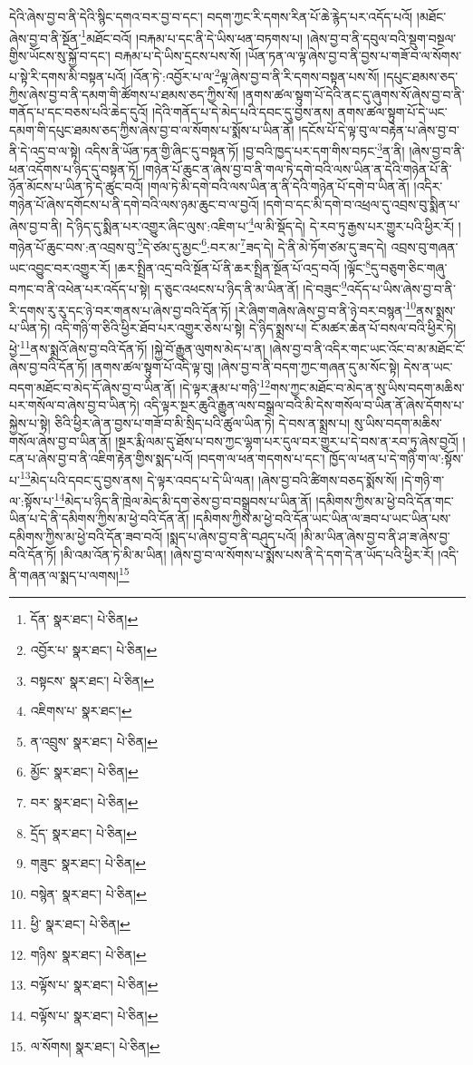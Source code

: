 དེའི་ཞེས་བྱ་བ་ནི་དེའི་སྙིང་དགའ་བར་བྱ་བ་དང་། བདག་ཀྱང་རི་དགས་རིན་པོ་ཆེ་རྙེད་པར་འདོད་པའོ། །མཐོང་ཞེས་བྱ་བ་ནི་སྔོན་\footnote{དོན་  སྣར་ཐང་།  པེ་ཅིན། }མཐོང་བའོ། །བརྐམ་པ་དང་ནི་དེ་ཡིས་ཕན་བཏགས་པ། །ཞེས་བྱ་བ་ནི་དབུལ་བའི་སྡུག་བསྔལ་གྱིས་ཡོངས་སུ་སྐྱོ་བ་དང་། བརྐམ་པ་དེ་ཡིས་དྲངས་པས་སོ། །ཡོན་ཏན་ལ་ལྟ་ཞེས་བྱ་བ་ནི་བྱས་པ་གཟོ་བ་ལ་སོགས་པ་སྟེ་རི་དགས་མི་བསྟན་པའོ། །འོན་ཏེ་:འབྱོར་པ་ལ་\footnote{འབྱོར་པ་  སྣར་ཐང་།  པེ་ཅིན། }ལྟ་ཞེས་བྱ་བ་ནི་རི་དགས་བསྟན་པས་སོ། །དཔུང་ཐམས་ཅད་ཀྱིས་ཞེས་བྱ་བ་ནི་དམག་གི་ཚོགས་པ་ཐམས་ཅད་ཀྱིས་སོ། །ནགས་ཚལ་སྟུག་པོ་དེའི་ནང་དུ་ཞུགས་སོ་ཞེས་བྱ་བ་ནི་གནོད་པ་དང་བཅས་པའི་ཆེད་དུའོ། །དེའི་གནོད་པ་དེ་མེད་པའི་དབང་དུ་བྱས་ནས། ནགས་ཚལ་སྟུག་པོ་དེ་ཡང་དམག་གི་དཔུང་ཐམས་ཅད་ཀྱིས་ཞེས་བྱ་བ་ལ་སོགས་པ་སྨོས་པ་ཡིན་ནོ། །དངོས་པོ་དེ་ལྟ་བུ་ལ་བརྟེན་པ་ཞེས་བྱ་བ་ནི་དེ་འདྲ་བ་ལ་སྟེ། འདིས་ནི་ཡོན་ཏན་གྱི་ཞིང་དུ་བསྟན་ཏོ། །བྱ་བའི་ཁྱད་པར་དག་གིས་བཏང་\footnote{བསྟངས་  སྣར་ཐང་།  པེ་ཅིན། }ན་ནི། །ཞེས་བྱ་བ་ནི་ཕན་འདོགས་པ་ཉིད་དུ་བསྟན་ཏོ། །གཉེན་པོ་ཆུང་ན་ཞེས་བྱ་བ་ནི་གལ་ཏེ་དགེ་བའི་ལས་ཡིན་ན་དེའི་གཉེན་པོ་ནི་ཉོན་མོངས་པ་ཡིན་ཏེ་དེ་ཚུང་བའོ། །གལ་ཏེ་མི་དགེ་བའི་ལས་ཡིན་ན་ནི་དེའི་གཉེན་པོ་དགེ་བ་ཡིན་ནོ། །འདིར་གཉེན་པོ་ཞེས་དགོངས་པ་ནི་དགེ་བའི་ལས་ཉམ་ཆུང་བ་ལ་བྱའོ། །དགེ་བ་དང་མི་དགེ་བ་འཕྲལ་དུ་འབྲས་བུ་སྨིན་པ་ཞེས་བྱ་བ་ནི། དེ་ཉིད་དུ་སྨིན་པར་འགྱུར་ཞིང་ལུས་:འཇིག་པ་\footnote{འཇིགས་པ་  སྣར་ཐང་། }ལ་མི་སྡོད་དེ། དེ་རབ་ཏུ་རྒྱས་པར་གྱུར་པའི་ཕྱིར་རོ། །གཉེན་པོ་ཆུང་བས་:ན་འབྲས་བུ་\footnote{ན་འབྲུས་  སྣར་ཐང་།  པེ་ཅིན། }དེ་ཙམ་དུ་མྱང་\footnote{མྱོང་  སྣར་ཐང་།  པེ་ཅིན། }:བར་མ་\footnote{བར་  སྣར་ཐང་།  པེ་ཅིན། }ཟད་དེ། དེ་ནི་མེ་ཏོག་ཙམ་དུ་ཟད་དེ། འབྲས་བུ་གཞན་ཡང་འབྱུང་བར་འགྱུར་རོ། །ཆར་སྤྲིན་འདྲ་བའི་སྔོན་པོ་ནི་ཆར་སྤྲིན་སྔོན་པོ་འདྲ་བའོ། །ལྟོང་\footnote{དྲོད་  སྣར་ཐང་།  པེ་ཅིན། }དུ་བཅུག་ཅིང་གཞུ་བཀང་བ་ནི་འཕེན་པར་འདོད་པ་སྟེ། ད་ཅུང་འཕངས་པ་ཉིད་ནི་མ་ཡིན་ནོ། །དེ་བཟུང་\footnote{གཟུང་  སྣར་ཐང་།  པེ་ཅིན། }འདོད་པ་ཡིས་ཞེས་བྱ་བ་ནི་རི་དགས་རུ་རུ་དང་ཉེ་བར་གནས་པ་ཞེས་བྱ་བའི་དོན་ཏོ། །རེ་ཞིག་གཞེས་ཞེས་བྱ་བ་ནི་ཉེ་བར་བསྙན་\footnote{བསྙེན་  སྣར་ཐང་།  པེ་ཅིན། }ནས་སྨྲས་པ་ཡིན་ཏེ། འདི་གཉི་ག་ཅིའི་ཕྱིར་ཐོབ་པར་འགྱུར་ཅེས་པ་སྟེ། དེ་ཉིད་སྨྲས་པ། ངོ་མཚར་ཆེན་པོ་བསལ་བའི་ཕྱིར་ཏེ། ཕྱེ་\footnote{ཕྱི་  སྣར་ཐང་།  པེ་ཅིན། }ནས་སྨྲའོ་ཞེས་བྱ་བའི་དོན་ཏོ། །སྐྱེ་བོ་རྒྱུན་ལུགས་མེད་པ་ན། །ཞེས་བྱ་བ་ནི་འདིར་གང་ཡང་འོང་བ་མ་མཐོང་ངོ་ཞེས་བྱ་བའི་དོན་ཏོ། །ནགས་ཚལ་སྟུག་པོ་འདི་ལྟ་བུ། །ཞེས་བྱ་བ་ནི་བདག་ཀྱང་གཞན་དུ་མ་སོང་སྟེ། དེས་ན་ཡང་བདག་མཐོང་བ་མེད་དོ་ཞེས་བྱ་བ་ཡིན་ནོ། །དེ་ལྟར་རྣམ་པ་གཉི་\footnote{གཉིས་  སྣར་ཐང་།  པེ་ཅིན། }གས་ཀྱང་མཐོང་བ་མེད་ན་སུ་ཡིས་བདག་མཆིས་པར་གསོལ་བ་ཞེས་བྱ་བ་ཡིན་ཏེ། འདི་ལྟར་སྔར་ཆུའི་རྒྱུན་ལས་བསྒྲལ་བའི་མི་དེས་གསོལ་བ་ཡིན་ནོ་ཞེས་དོགས་པ་སྐྱེས་པ་སྟེ། ཅིའི་ཕྱིར་ཞེ་ན་བྱས་པ་གཟོ་བ་མི་སྲིད་པའི་ཚུལ་ཡིན་ཏེ། དེ་བས་ན་སྨྲས་པ། སུ་ཡིས་བདག་མཆིས་གསོལ་ཞེས་བྱ་བ་ཡིན་ནོ། །སྔར་རྨི་ལམ་དུ་ཐོས་པ་བས་ཀྱང་ལྷག་པར་དུལ་བར་གྱུར་པ་དེ་བས་ན་རབ་ཏུ་ཞེས་བྱའོ། །ངན་པ་ཞེས་བྱ་བ་ནི་འཇིག་རྟེན་གྱིས་སྨད་པའོ། །བདག་ལ་ཕན་གདགས་པ་དང་། ཁྱོད་ལ་ཕན་པ་དེ་གཉི་ག་ལ་:སྟོས་པ་\footnote{བལྟོས་པ་  སྣར་ཐང་།  པེ་ཅིན། }མེད་པའི་དབང་དུ་བྱས་ནས། དེ་ལྟར་འབད་པ་དེ་ཡི་ལན། །ཞེས་བྱ་བའི་ཚིགས་བཅད་སྨོས་སོ། །དེ་གཉི་ག་ལ་:སྟོས་པ་\footnote{བལྟོས་པ་  སྣར་ཐང་།  པེ་ཅིན། }མེད་པ་ཉིད་ནི་ཁྲེལ་མེད་མི་དག་ཅེས་བྱ་བ་བསྒྲུབས་པ་ཡིན་ནོ། །དམིགས་ཀྱིས་མ་ཕྱེ་བའི་དོན་གང་ཡིན་པ་དེ་ནི་དམིགས་ཀྱིས་མ་ཕྱེ་བའི་དོན་ནོ། །དམིགས་ཀྱིས་མ་ཕྱེ་བའི་དོན་ཡང་ཡིན་ལ་ཟབ་པ་ཡང་ཡིན་པས་དམིགས་ཀྱིས་མ་ཕྱེ་བའི་དོན་ཟབ་བའོ། །སྨད་པ་ཞེས་བྱ་བ་ནི་བཤུད་པའོ། །མི་མ་ཡིན་ཞེས་བྱ་བ་ནི་ཤ་ཟ་ཞེས་བྱ་བའི་དོན་ཏོ། །མི་འམ་འོན་ཏེ་མི་མ་ཡིན། །ཞེས་བྱ་བ་ལ་སོགས་པ་སྨོས་པས་ནི་དེ་དག་དེ་ན་ཡོད་པའི་ཕྱིར་རོ། །འདི་ནི་གཞན་ལ་སྨད་པ་ལགས།\footnote{ལ་སོགས།  སྣར་ཐང་།  པེ་ཅིན། } 